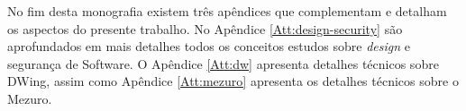 No fim desta monografia existem três apêndices que complementam e detalham os aspectos do presente trabalho. No Apêndice \ref{Att:design-security} são aprofundados em mais detalhes todos os conceitos estudos sobre \emph{design} e segurança de Software. O Apêndice \ref{Att:dw} apresenta detalhes técnicos sobre DWing, assim como Apêndice \ref{Att:mezuro} apresenta os detalhes técnicos sobre o Mezuro.
